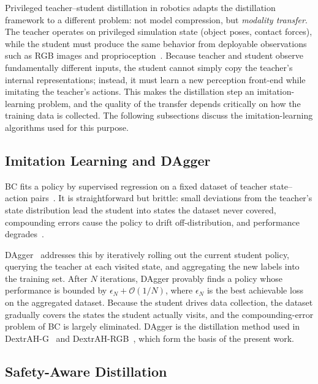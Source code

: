 Privileged teacher--student distillation in robotics adapts the distillation framework to a different problem: not model compression, but \emph{modality transfer}.
The teacher operates on privileged simulation state (object poses, contact forces), while the student must produce the same behavior from deployable observations such as RGB images and proprioception~\cite{Lum2024, Singh2025}.
Because teacher and student observe fundamentally different inputs, the student cannot simply copy the teacher's internal representations; instead, it must learn a new perception front-end while imitating the teacher's actions.
This makes the distillation step an imitation-learning problem, and the quality of the transfer depends critically on how the training data is collected.
The following subsections discuss the imitation-learning algorithms used for this purpose.

\subsection{Imitation Learning and DAgger}%
\label{subsec:bc_dagger}%

\ac{BC} fits a policy by supervised regression on a fixed dataset of teacher state--action pairs~\cite{Pomerleau1988}.
It is straightforward but brittle: small deviations from the teacher's state distribution lead the student into states the dataset never covered, compounding errors cause the policy to drift off-distribution, and performance degrades~\cite{Ross2011}.

DAgger~\cite{Ross2011} addresses this by iteratively rolling out the current student policy, querying the teacher at each visited state, and aggregating the new labels into the training set.
After $N$ iterations, DAgger provably finds a policy whose performance is bounded by $\epsilon_N + \mathcal{O}(1/N)$, where $\epsilon_N$ is the best achievable loss on the aggregated dataset.
Because the student drives data collection, the dataset gradually covers the states the student actually visits, and the compounding-error problem of \ac{BC} is largely eliminated.
DAgger is the distillation method used in DextrAH-G~\cite{Lum2024} and DextrAH-RGB~\cite{Singh2025}, which form the basis of the present work.

\subsection{Safety-Aware Distillation}%
\label{subsec:safe_dagger}%

